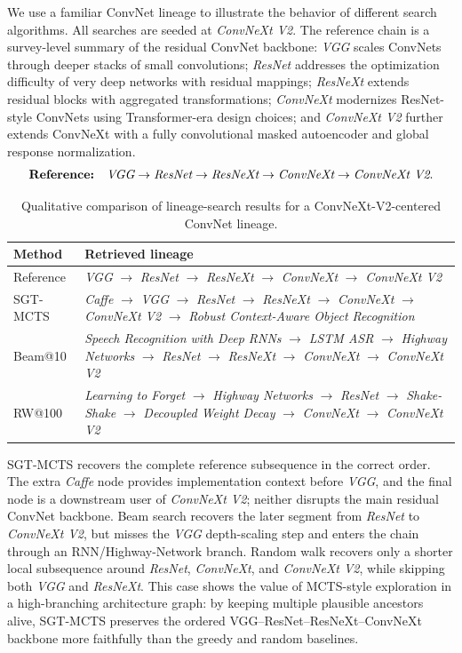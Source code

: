 \documentclass{opendatalab}
\begin{document}
We use a familiar ConvNet lineage to illustrate the behavior of different search algorithms. All searches are seeded at \emph{ConvNeXt V2}. The reference
chain is a survey-level summary of the residual ConvNet backbone: \emph{VGG} scales ConvNets through deeper stacks of small convolutions; \emph{ResNet}
addresses the optimization difficulty of very deep networks with residual mappings; \emph{ResNeXt} extends residual blocks with aggregated transformations;
\emph{ConvNeXt} modernizes ResNet-style ConvNets using Transformer-era design choices; and \emph{ConvNeXt V2} further extends ConvNeXt with a fully
convolutional masked autoencoder and global response normalization.
\[
\textbf{Reference:}\quad
\emph{VGG}\rightarrow
\emph{ResNet}\rightarrow
\emph{ResNeXt}\rightarrow
\emph{ConvNeXt}\rightarrow
\emph{ConvNeXt V2}.
\]

\begin{table}[h]
\centering
\small
\caption{Qualitative comparison of lineage-search results for a ConvNeXt-V2-centered ConvNet lineage.}
\label{tab:case-study-resnet-lineage}
\begin{tabularx}{\linewidth}{l X}
\toprule
\textbf{Method} & \textbf{Retrieved lineage} \\
\midrule
Reference &
\emph{VGG} $\rightarrow$ \emph{ResNet} $\rightarrow$ \emph{ResNeXt}
$\rightarrow$ \emph{ConvNeXt} $\rightarrow$ \emph{ConvNeXt V2} \\
SGT-MCTS &
\emph{Caffe} $\rightarrow$ \emph{VGG} $\rightarrow$ \emph{ResNet}
$\rightarrow$ \emph{ResNeXt} $\rightarrow$ \emph{ConvNeXt}
$\rightarrow$ \emph{ConvNeXt V2} $\rightarrow$
\emph{Robust Context-Aware Object Recognition} \\
Beam@10 &
\emph{Speech Recognition with Deep RNNs} $\rightarrow$ \emph{LSTM ASR}
$\rightarrow$ \emph{Highway Networks} $\rightarrow$ \emph{ResNet}
$\rightarrow$ \emph{ResNeXt} $\rightarrow$ \emph{ConvNeXt}
$\rightarrow$ \emph{ConvNeXt V2} \\
RW@100 &
\emph{Learning to Forget} $\rightarrow$ \emph{Highway Networks}
$\rightarrow$ \emph{ResNet} $\rightarrow$ \emph{Shake-Shake}
$\rightarrow$ \emph{Decoupled Weight Decay} $\rightarrow$
\emph{ConvNeXt} $\rightarrow$ \emph{ConvNeXt V2} \\
\bottomrule
\end{tabularx}
\end{table}

SGT-MCTS recovers the complete reference subsequence in the correct order. The extra \emph{Caffe} node provides implementation context before \emph{VGG},
and the final node is a downstream user of \emph{ConvNeXt V2}; neither disrupts the main residual ConvNet backbone. Beam search recovers the later segment
from \emph{ResNet} to \emph{ConvNeXt V2}, but misses the \emph{VGG} depth-scaling step and enters the chain through an RNN/Highway-Network branch. Random
walk recovers only a shorter local subsequence around \emph{ResNet}, \emph{ConvNeXt}, and \emph{ConvNeXt V2}, while skipping both \emph{VGG} and
\emph{ResNeXt}. This case shows the value of MCTS-style exploration in a high-branching architecture graph: by keeping multiple plausible ancestors alive,
SGT-MCTS preserves the ordered VGG--ResNet--ResNeXt--ConvNeXt backbone more faithfully than the greedy and random baselines.
\end{document}
